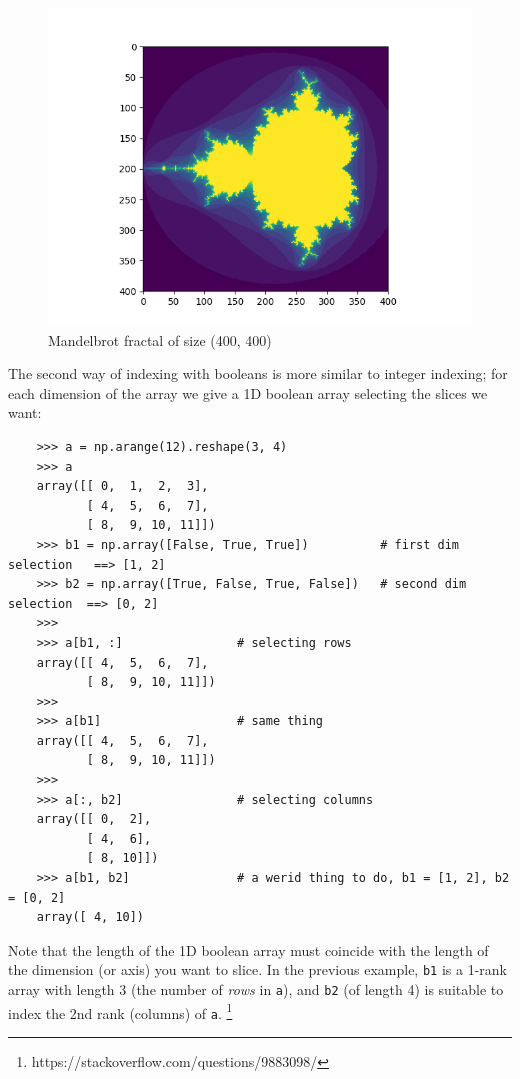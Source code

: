 \documentclass[UTF8]{article}
\begin{document}
\begin{figure}[ht]
    \centering
    \includegraphics[scale=0.6]{mandelbrot.png}
    \caption{Mandelbrot fractal of size (400, 400)}
\end{figure}

The second way of indexing with booleans is more similar to integer indexing; for each dimension of
the array we give a 1D boolean array selecting the slices we want:
\begin{verbatim}
    >>> a = np.arange(12).reshape(3, 4)
    >>> a
    array([[ 0,  1,  2,  3],
           [ 4,  5,  6,  7],
           [ 8,  9, 10, 11]])
    >>> b1 = np.array([False, True, True])          # first dim selection   ==> [1, 2]
    >>> b2 = np.array([True, False, True, False])   # second dim selection  ==> [0, 2]
    >>>
    >>> a[b1, :]                # selecting rows
    array([[ 4,  5,  6,  7],
           [ 8,  9, 10, 11]])
    >>>
    >>> a[b1]                   # same thing
    array([[ 4,  5,  6,  7],
           [ 8,  9, 10, 11]])
    >>>
    >>> a[:, b2]                # selecting columns
    array([[ 0,  2],
           [ 4,  6],
           [ 8, 10]])
    >>> a[b1, b2]               # a werid thing to do, b1 = [1, 2], b2 = [0, 2]
    array([ 4, 10])
\end{verbatim}
Note that the length of the 1D boolean array must coincide with the length of the dimension (or
axis) you want to slice. In the previous example, \texttt{b1} is a 1-rank array with length 3 (the
number of \emph{rows} in \texttt{a}), and \texttt{b2} (of length 4) is suitable to index the 2nd
rank (columns) of \texttt{a}.
\footnote{https://stackoverflow.com/questions/9883098/}
\end{document}
